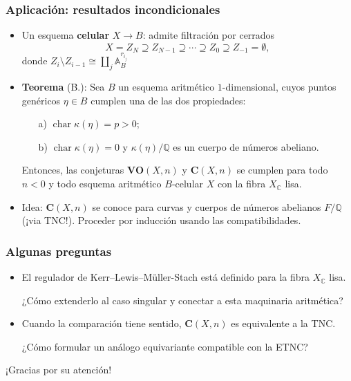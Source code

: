 \documentclass[handout]{beamer}
\newcommand{\CC}{\mathbb{C}}
\newcommand{\QQ}{\mathbb{Q}}
\DeclareMathOperator{\fchar}{char}
\renewcommand{\AA}{\mathbb{A}}
\begin{document}
\begin{frame}
  \frametitle{Aplicación: resultados incondicionales}

  \begin{itemize}
  \item Un esquema \textbf{celular} $X \to B$: admite filtración por cerrados
    \[ X = Z_N \supseteq Z_{N-1} \supseteq \cdots \supseteq Z_0 \supseteq Z_{-1} = \emptyset, \]
    donde $Z_i\setminus Z_{i-1} \cong \coprod_j \AA^{r_{i_j}}_B$

  \item \textbf{Teorema} (B.): Sea $B$ un esquema aritmético $1$-dimensional,
    cuyos puntos genéricos $\eta \in B$ cumplen una de las dos propiedades:
    \begin{enumerate}
    \item[a)] $\fchar \kappa (\eta) = p > 0$;

    \item[b)] $\fchar \kappa (\eta) = 0$ y $\kappa (\eta)/\QQ$ es un cuerpo de
      números abeliano.
    \end{enumerate}

    Entonces, las conjeturas $\mathbf{VO} (X,n)$ y $\mathbf{C} (X,n)$ se cumplen
    para todo $n < 0$ y todo esquema aritmético $B$-celular $X$ con la fibra
    $X_\CC$ lisa.

  \item Idea: $\mathbf{C} (X,n)$ se conoce para curvas y cuerpos de números
    abelianos $F/\QQ$ (¡via TNC!). Proceder por inducción usando las
    compatibilidades.
  \end{itemize}
\end{frame}


\begin{frame}
  \frametitle{Algunas preguntas}

  \begin{itemize}
  \item El regulador de Kerr--Lewis--Müller-Stach está definido para la fibra
    $X_\CC$ lisa.

    ¿Cómo extenderlo al caso singular y conectar a esta maquinaria aritmética?

  \item Cuando la comparación tiene sentido, $\mathbf{C} (X,n)$ es equivalente a
    la TNC.

    ¿Cómo formular un análogo equivariante compatible con la ETNC?
  \end{itemize}
\end{frame}


\begin{frame}[plain]
  \headingfont

  \begin{center}
    {\huge ¡Gracias por su atención!}
  \end{center}
\end{frame}
\end{document}
